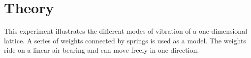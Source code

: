 \chapter{Theory}
This experiment illustrates the different modes of vibration of a one-dimensional lattice.
A series of weights connected by springs is used as a model.
The weights ride on a linear air bearing and can move freely in one direction.

